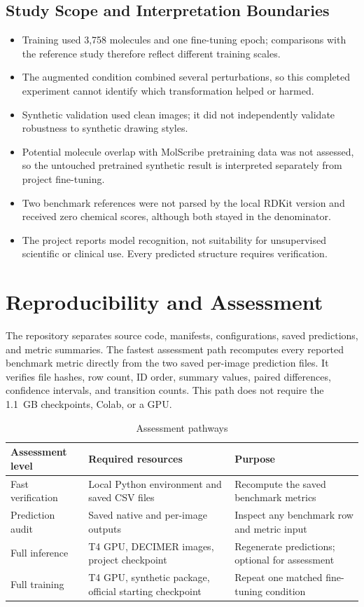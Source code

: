 \documentclass[11pt,a4paper]{article}
\begin{document}
\subsection*{Study Scope and Interpretation Boundaries}

\begin{itemize}
  \item Training used 3,758 molecules and one fine-tuning epoch; comparisons with the reference study therefore reflect different training scales.
  \item The augmented condition combined several perturbations, so this completed experiment cannot identify which transformation helped or harmed.
  \item Synthetic validation used clean images; it did not independently validate robustness to synthetic drawing styles.
  \item Potential molecule overlap with MolScribe pretraining data was not assessed, so the untouched pretrained synthetic result is interpreted separately from project fine-tuning.
  \item Two benchmark references were not parsed by the local RDKit version and received zero chemical scores, although both stayed in the denominator.
  \item The project reports model recognition, not suitability for unsupervised scientific or clinical use. Every predicted structure requires verification.
\end{itemize}

\section*{Reproducibility and Assessment}

The repository separates source code, manifests, configurations, saved predictions, and metric
summaries. The fastest assessment path recomputes every reported benchmark metric directly
from the two saved per-image prediction files. It verifies file hashes, row count, ID order,
summary values, paired differences, confidence intervals, and transition counts. This path
does not require the 1.1~GB checkpoints, Colab, or a GPU.

\begin{table}[H]
\centering
\caption{Assessment pathways}
\begin{tabularx}{\textwidth}{L{3cm}L{5.2cm}Y}
\toprule
\textbf{Assessment level} & \textbf{Required resources} & \textbf{Purpose} \\
\midrule
Fast verification & Local Python environment and saved CSV files & Recompute the saved benchmark metrics \\
Prediction audit & Saved native and per-image outputs & Inspect any benchmark row and metric input \\
Full inference & T4 GPU, DECIMER images, project checkpoint & Regenerate predictions; optional for assessment \\
Full training & T4 GPU, synthetic package, official starting checkpoint & Repeat one matched fine-tuning condition \\
\bottomrule
\end{tabularx}
\end{table}
\end{document}
